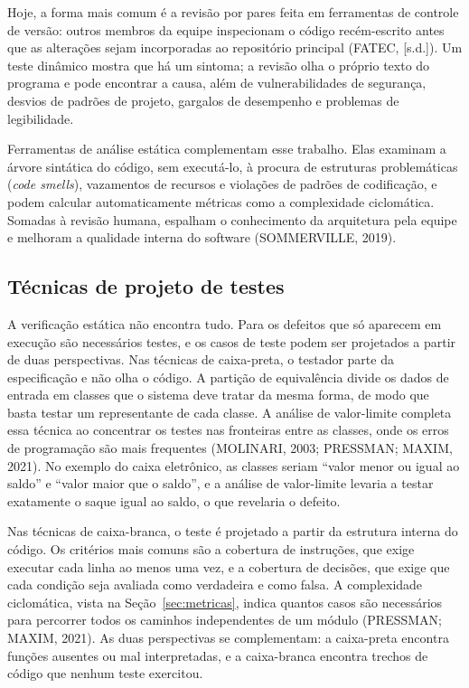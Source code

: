 \documentclass[12pt,a4paper]{article}
\begin{document}
Hoje, a forma mais comum é a revisão por pares feita em ferramentas de controle de versão: outros membros da equipe inspecionam o código recém-escrito antes que as alterações sejam incorporadas ao repositório principal (FATEC, [s.d.]). Um teste dinâmico mostra que há um sintoma; a revisão olha o próprio texto do programa e pode encontrar a causa, além de vulnerabilidades de segurança, desvios de padrões de projeto, gargalos de desempenho e problemas de legibilidade.

Ferramentas de análise estática complementam esse trabalho. Elas examinam a árvore sintática do código, sem executá-lo, à procura de estruturas problemáticas (\textit{code smells}), vazamentos de recursos e violações de padrões de codificação, e podem calcular automaticamente métricas como a complexidade ciclomática. Somadas à revisão humana, espalham o conhecimento da arquitetura pela equipe e melhoram a qualidade interna do software (SOMMERVILLE, 2019).

\subsection{Técnicas de projeto de testes}
\label{sec:tecnicas}

A verificação estática não encontra tudo. Para os defeitos que só aparecem em execução são necessários testes, e os casos de teste podem ser projetados a partir de duas perspectivas. Nas técnicas de caixa-preta, o testador parte da especificação e não olha o código. A partição de equivalência divide os dados de entrada em classes que o sistema deve tratar da mesma forma, de modo que basta testar um representante de cada classe. A análise de valor-limite completa essa técnica ao concentrar os testes nas fronteiras entre as classes, onde os erros de programação são mais frequentes (MOLINARI, 2003; PRESSMAN; MAXIM, 2021). No exemplo do caixa eletrônico, as classes seriam ``valor menor ou igual ao saldo'' e ``valor maior que o saldo'', e a análise de valor-limite levaria a testar exatamente o saque igual ao saldo, o que revelaria o defeito.

Nas técnicas de caixa-branca, o teste é projetado a partir da estrutura interna do código. Os critérios mais comuns são a cobertura de instruções, que exige executar cada linha ao menos uma vez, e a cobertura de decisões, que exige que cada condição seja avaliada como verdadeira e como falsa. A complexidade ciclomática, vista na Seção~\ref{sec:metricas}, indica quantos casos são necessários para percorrer todos os caminhos independentes de um módulo (PRESSMAN; MAXIM, 2021). As duas perspectivas se complementam: a caixa-preta encontra funções ausentes ou mal interpretadas, e a caixa-branca encontra trechos de código que nenhum teste exercitou.
\end{document}
